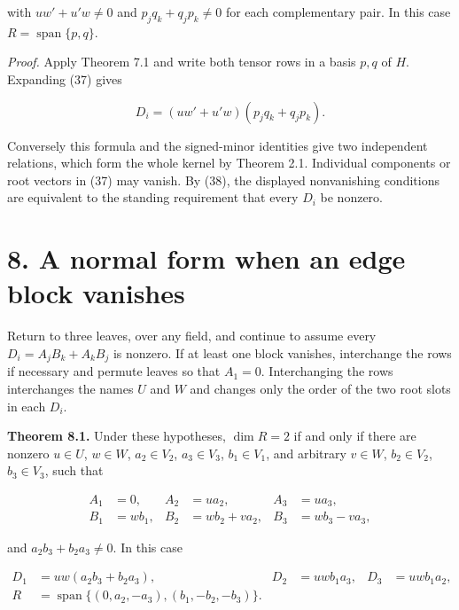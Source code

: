 \documentclass[11pt]{article}
\begin{document}
with $uw'+u'w\ne0$ and $p_jq_k+q_jp_k\ne0$ for each complementary pair. In this case $R=\operatorname{span}\{p,q\}$.


\emph{Proof.} Apply Theorem 7.1 and write both tensor rows in a basis $p,q$ of $H$. Expanding (37) gives


\nopagebreak[4]

\begin{equation}
D_i=(uw'+u'w)(p_jq_k+q_jp_k).
\tag{38}
\end{equation}

Conversely this formula and the signed-minor identities give two independent relations, which form the whole kernel by Theorem 2.1. Individual components or root vectors in (37) may vanish. By (38), the displayed nonvanishing conditions are equivalent to the standing requirement that every $D_i$ be nonzero.


\section*{8. A normal form when an edge block vanishes}

Return to three leaves, over any field, and continue to assume every $D_i=A_jB_k+A_kB_j$ is nonzero. If at least one block vanishes, interchange the rows if necessary and permute leaves so that $A_1=0$. Interchanging the rows interchanges the names $U$ and $W$ and changes only the order of the two root slots in each $D_i$.


\textbf{Theorem 8.1.} Under these hypotheses, $\dim R=2$ if and only if there are nonzero $u\in U$, $w\in W$, $a_2\in V_2$, $a_3\in V_3$, $b_1\in V_1$, and arbitrary $v\in W$, $b_2\in V_2$, $b_3\in V_3$, such that


\nopagebreak[4]

\begin{equation}
\begin{aligned}
A_1&=0,& A_2&=ua_2,& A_3&=ua_3,\\
B_1&=wb_1,& B_2&=wb_2+va_2,& B_3&=wb_3-va_3,
\end{aligned}
\tag{39}
\end{equation}

and $a_2b_3+b_2a_3\ne0$. In this case


\nopagebreak[4]

\begin{equation}
\begin{aligned}
D_1&=uw(a_2b_3+b_2a_3),&
D_2&=uwb_1a_3,&D_3&=uwb_1a_2,\\
R&=\operatorname{span}\{(0,a_2,-a_3),(b_1,-b_2,-b_3)\}.
\end{aligned}
\tag{40}
\end{equation}
\end{document}
